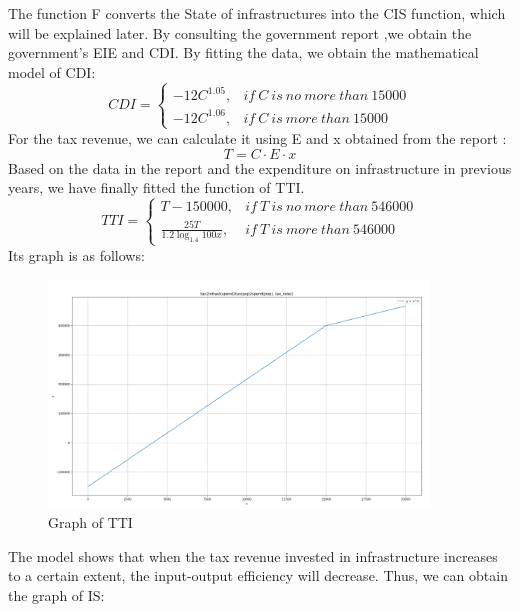 \documentclass[12pt]{article}  %
\begin{document}
\begin{enumerate}[(1)]
The function F converts the State of infrastructures into the CIS function, which will be explained later. By consulting the government report \cite{Inf},we obtain the government's EIE and CDI. By fitting the data, we obtain the mathematical model of CDI:
$$
CDI=
\begin{cases}
    -12C^{1.05}, &if\ C\ is\ no\ more\ than\ 15000\\
    -12C^{1.06}, &if\ C\ is\ more\ than\ 15000
\end{cases}
$$
For the tax revenue, we can calculate it using E and x obtained from the report \cite{spend}:
$$T=C\cdot E\cdot x$$
Based on the data in the report and the expenditure on infrastructure in previous years, we have finally fitted the function of TTI.
$$TTI=
\begin{cases}
    T-150000, &if\ T\ is\ no\ more\ than\ 546000\\
    \frac{25T}{1.2 \log_{1.4}{100x}}, &if\ T\ is\ more\ than\ 546000
\end{cases}
$$
Its graph is as follows:
\begin{figure}[H]  %
 
    \centering  %
    \includegraphics[width=0.9\textwidth]{tax2inf.png} %
    \caption{Graph of TTI} %
    \label{fig1}%
    \end{figure}
    The model shows that when the tax revenue invested in infrastructure increases to a certain extent, the input-output efficiency will decrease. Thus, we can obtain the graph of IS:
\begin{figure}[H]  %
 

\end{figure}
\end{enumerate}
\end{document}
